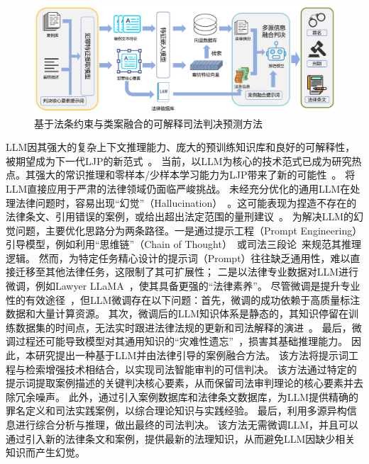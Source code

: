 \begin{figure}[htpb]
	\centering
	\includegraphics[width=1\textwidth]{fig/method2.pdf}
	\caption{基于法条约束与类案融合的可解释司法判决预测方法}
	\label{fig:main}
\end{figure}

LLM因其强大的复杂上下文推理能力、庞大的预训练知识库和良好的可解释性，被期望成为下一代LJP的新范式~\cite{wu2020de-biased,yang2023baichuan,yao2020refining}。
当前，以LLM为核心的技术范式已成为研究热点。其强大的常识推理和零样本/少样本学习能力为LJP带来了新的可能性~\cite{brown2020language,huang2022towards,shu2024large,wen2024review}。
将LLM直接应用于严肃的法律领域仍面临严峻挑战。
未经充分优化的通用LLM在处理法律问题时，容易出现“幻觉”（Hallucination）~\cite{cui2023survey,radford2025improving,raffel2020exploring}。这可能表现为捏造不存在的法律条文、引用错误的案例，或给出超出法定范围的量刑建议~\cite{lewis2020retrieval}。
为解决LLM的幻觉问题，主要优化思路分为两条路径。一是通过提示工程（Prompt Engineering）引导模型，例如利用“思维链”（Chain of Thought）~\cite{kojima2022large,izacard2021leveraging,rajani2019explain,talmor2019leap,wang2023self,wei2022chain}或司法三段论~\cite{huang2023lawyer,trautmann2022legal,xu2023superclue,yu2022legal}来规范其推理逻辑。
然而，为特定任务精心设计的提示词（Prompt）往往缺乏通用性，难以直接迁移至其他法律任务，这限制了其可扩展性；
二是以法律专业数据对LLM进行微调，例如Lawyer LLaMA~\cite{chen2020recall,yue2021circumstances}，使其具备更强的“法律素养”。
尽管微调是提升专业性的有效途径~\cite{hu2021lora,hu2022lora,zelikman2024star}，但LLM微调存在以下问题：首先，微调的成功依赖于高质量标注数据和大量计算资源。
其次，微调后的LLM知识体系是静态的，其知识停留在训练数据集的时间点，无法实时跟进法律法规的更新和司法解释的演进~\cite{li2021prefix,zhang2024comprehensive}。
最后，微调过程还可能导致模型对其通用知识的“灾难性遗忘”~\cite{chen2020recall}，损害其基础推理能力。
因此，本研究提出一种基于LLM并由法律引导的案例融合方法。
该方法将提示词工程与检索增强技术相结合，以实现司法智能审判的可信判决。
该方法通过特定的提示词提取案例描述的关键判决核心要素，从而保留司法审判理论的核心要素并去除冗余噪声。
此外，通过引入案例数据库和法律条文数据库，为LLM提供精确的罪名定义和司法实践案例，以综合理论知识与实践经验。
最后，利用多源异构信息进行综合分析与推理，做出最终的司法判决。
该方法无需微调LLM，并且可以通过引入新的法律条文和案例，提供最新的法理知识，从而避免LLM因缺少相关知识而产生幻觉。


